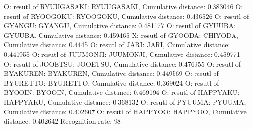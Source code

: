 O: resutl of RYUUGASAKI: RYUUGASAKI, Cumulative distance: 0.383046
O: resutl of RYOOGOKU: RYOOGOKU, Cumulative distance: 0.436526
O: resutl of GYANGU: GYANGU, Cumulative distance: 0.481177
O: resutl of GYUUBA: GYUUBA, Cumulative distance: 0.459465
X: resutl of GYOODA: CHIYODA, Cumulative distance: 0.4445
O: resutl of JARI: JARI, Cumulative distance: 0.441955
O: resutl of JUUMONJI: JUUMONJI, Cumulative distance: 0.459771
O: resutl of JOOETSU: JOOETSU, Cumulative distance: 0.476955
O: resutl of BYAKUREN: BYAKUREN, Cumulative distance: 0.449569
O: resutl of BYURETTO: BYURETTO, Cumulative distance: 0.369024
O: resutl of BYOOIN: BYOOIN, Cumulative distance: 0.469194
O: resutl of HAPPYAKU: HAPPYAKU, Cumulative distance: 0.368132
O: resutl of PYUUMA: PYUUMA, Cumulative distance: 0.402607
O: resutl of HAPPYOO: HAPPYOO, Cumulative distance: 0.402642
Recognition rate: 98%
